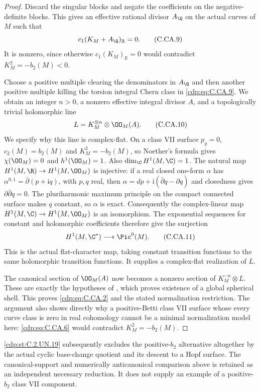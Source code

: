 \begin{proof}
Discard the singular blocks and negate the coefficients
on the negative-definite blocks. This gives an effective
rational divisor $A_{\Q}$ on the actual curves of $M$
such that
\[
                   c_1(K_M+A_{\Q})_{\mathbb R}=0.        \tag{C.CA.9}\label{cdp:eq:C.CA.9}
\]
It is nonzero, since otherwise $c_1(K_M)_{\mathbb R}=0$
would contradict $K_M^2=-b_2(M)<0$.

Choose a positive multiple clearing the denominators in
$A_{\Q}$ and then another positive multiple killing the
torsion integral Chern class in \eqref{cdp:eq:C.CA.9}. We obtain an
integer $n>0$, a nonzero effective integral divisor $A$,
and a topologically trivial holomorphic line
\[
                       L=K_M^{\otimes n}\otimes\OO_M(A).
                                                               \tag{C.CA.10}\label{cdp:eq:C.CA.10}
\]
We specify why this line is complex-flat. On a class VII
surface $p_g=0$, $c_2(M)=b_2(M)$ and $K_M^2=-b_2(M)$,
so Noether's formula gives $\chi(\OO_M)=0$ and
$h^1(\OO_M)=1$. Also $\dim_{\C}H^1(M,\C)=1$.
The natural map $H^1(M,\R)\to H^1(M,\OO_M)$ is
injective: if a real closed one-form $\alpha$ has
$\alpha^{0,1}=\bar\partial(p+\mathrm i q)$, with $p,q$
real, then
$\alpha=dp+\mathrm i(\bar\partial q-\partial q)$ and
closedness gives $\partial\bar\partial q=0$. The
pluriharmonic maximum principle on the compact connected
surface makes $q$ constant, so $\alpha$ is exact.
Consequently the complex-linear map
$H^1(M,\C)\to H^1(M,\OO_M)$ is an isomorphism.
The exponential sequences for constant and holomorphic
coefficients therefore give the surjection
\[
             H^1(M,\C^*)\longrightarrow\Pic^0(M).       \tag{C.CA.11}\label{cdp:eq:C.CA.11}
\]
This is the actual flat-character map, taking constant
transition functions to the same holomorphic transition
functions. It supplies a complex-flat realization of $L$.

The canonical section of $\OO_M(A)$ now becomes a
nonzero section of $K_M^{-n}\otimes L$. These are exactly
the hypotheses of \cite[Theorem~0.2]{Dloussky2006},
which proves existence of a global spherical shell.
This proves \eqref{cdp:eq:C.CA.2} and the stated normalization
restriction. The argument also shows directly why a
positive-Betti class VII surface whose every curve class
is zero in real cohomology cannot be a minimal
normalization model here: \eqref{cdp:eq:C.CA.6} would contradict
$K_M^2=-b_2(M)$.
\end{proof}

\ref{cdp:st:C.2.UN.19} subsequently excludes the positive-$b_2$ alternative
altogether by the actual cyclic base-change quotient and its
descent to a Hopf surface. The canonical-support and
numerically anticanonical comparison above is retained as an
independent necessary reduction. It does not supply an example
of a positive-$b_2$ class VII component.


